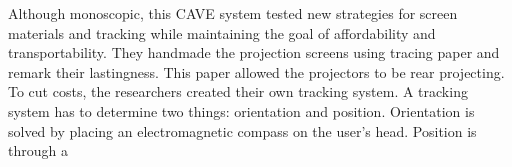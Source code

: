 %	

Although monoscopic, this CAVE system tested new strategies for screen materials and tracking while maintaining the goal of affordability and transportability. They handmade the projection screens using tracing paper and remark their lastingness. This paper allowed the projectors to be rear projecting. To cut costs, the researchers created their own tracking system. A tracking system has to determine two things: orientation and position. Orientation is solved by placing an electromagnetic compass on the user's head. Position is through a 



\filbreak
{}

%	

